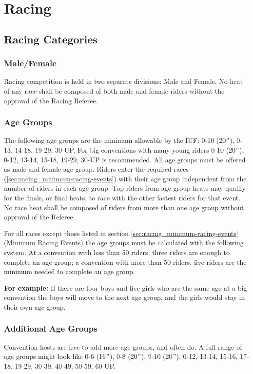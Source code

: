 \chapter{Racing}

\section{Racing Categories}

\subsection{Male/Female}
Racing competition is held in two separate divisions: Male and Female.
No heat of any race shall be composed of both male and female riders without the approval of the Racing Referee.

\subsection{Age Groups \label{subsec:racing_racing-categories_age-groups}}
The following age groups are the minimum allowable by the IUF: 0-10 (20$"$), 0-13, 14-18, 19-29, 30-UP.
For big conventions with many young riders 0-10 (20$"$), 0-12, 13-14, 15-18, 19-29, 30-UP is recommended.
All age groups must be offered as male and female age group.
Riders enter the required races (\ref{sec:racing_minimum-racing-events}) with their age group independent from the number of riders in each age group.
Top riders from age group heats may qualify for the finals, or final heats, to race with the other fastest riders for that event.
No race heat shall be composed of riders from more than one age group without approval of the Referee.

For all races except those listed in section \ref{sec:racing_minimum-racing-events} (Minimum Racing Events) the age groups must be calculated with the following system: At a convention with less than 50 riders, three riders are enough to complete an age group; a convention with more than 50 riders, five riders are the minimum needed to complete an age group.

\textbf{For example:} If there are four boys and five girls who are the same age at a big convention the boys will move to the next age group, and the girls would stay in their own age group.

\subsection{Additional Age Groups}
Convention hosts are free to add more age groups, and often do.
A full range of age groups might look like 0-6 (16$"$), 0-8 (20$"$), 9-10 (20$"$), 0-12, 13-14, 15-16, 17-18, 19-29, 30-39, 40-49, 50-59, 60-UP.

